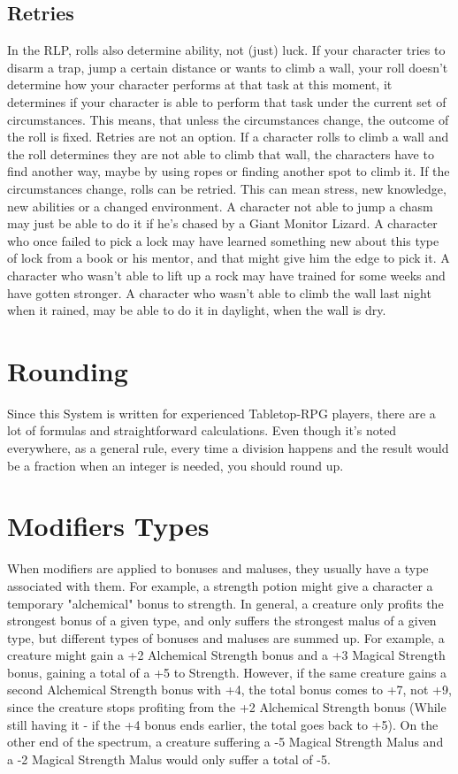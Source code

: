 \subsection{Retries}\label{subsec:retries}
In the RLP, rolls also determine ability, not (just) luck.
If your character tries to disarm a trap, jump a certain distance or wants to climb a wall, your roll doesn't determine how your character performs at that task at this moment, it determines if your character is able to perform that task under the current set of circumstances.
This means, that unless the circumstances change, the outcome of the roll is fixed.
Retries are not an option.
If a character rolls to climb a wall and the roll determines they are not able to climb that wall, the characters have to find another way, maybe by using ropes or finding another spot to climb it.
If the circumstances change, rolls can be retried.
This can mean stress, new knowledge, new abilities or a changed environment.
A character not able to jump a chasm may just be able to do it if he's chased by a Giant Monitor Lizard.
A character who once failed to pick a lock may have learned something new about this type of lock from a book or his mentor, and that might give him the edge to pick it.
A character who wasn't able to lift up a rock may have trained for some weeks and have gotten stronger.
A character who wasn't able to climb the wall last night when it rained, may be able to do it in daylight, when the wall is dry.


\section{Rounding}\label{sec:rounding}
Since this System is written for experienced Tabletop-RPG players, there are a lot of formulas and straightforward calculations.
Even though it's noted everywhere, as a general rule, every time a division happens and the result would be a fraction when an integer is needed, you should round up.

\section{Modifiers Types}\label{sec:modifierTypes}
When modifiers are applied to bonuses and maluses, they usually have a type associated with them.
For example, a strength potion might give a character a temporary "alchemical" bonus to strength.
In general, a creature only profits the strongest bonus of a given type, and only suffers the strongest malus of a given type, but different types of bonuses and maluses are summed up.
For example, a creature might gain a +2 Alchemical Strength bonus and a +3 Magical Strength bonus, gaining a total of a +5 to Strength.
However, if the same creature gains a second Alchemical Strength bonus with +4, the total bonus comes to +7, not +9, since the creature stops profiting from the +2 Alchemical Strength bonus (While still having it - if the +4 bonus ends earlier, the total goes back to +5).
On the other end of the spectrum, a creature suffering a -5 Magical Strength Malus and a -2 Magical Strength Malus would only suffer a total of -5.

